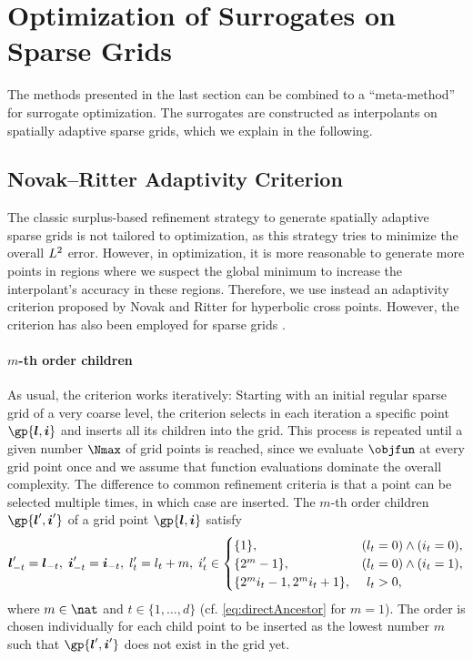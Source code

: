 \section{Optimization of Surrogates on Sparse Grids}
\label{sec:52method}

The methods presented in the last section can be combined to a
``meta-method'' for surrogate optimization.
The surrogates are constructed as interpolants on spatially adaptive
sparse grids, which we explain in the following.



\subsection{Novak--Ritter Adaptivity Criterion}
\label{sec:521novakRitter}

The classic surplus-based refinement strategy to generate
spatially adaptive sparse grids is not tailored to optimization,
as this strategy tries to minimize the overall $L^2$ error.
However, in optimization, it is more reasonable to generate more
points in regions where we suspect the global minimum
to increase the interpolant's accuracy in these regions.
Therefore, we use instead an adaptivity criterion proposed by
Novak and Ritter \cite{Novak96Global} for hyperbolic cross points.
However, the criterion has also been employed for sparse grids
.

\paragraph{$m$-th order children}

As usual, the criterion works iteratively:
Starting with an initial regular sparse grid of a very coarse level,
the criterion selects in each iteration a specific point $\gp{\*l,\*i}$
and inserts all its children into the grid.
This process is repeated until a given number $\Nmax$ of grid points is
reached,
since we evaluate $\objfun$ at every grid point once and we assume that
function evaluations dominate the overall complexity.
The difference to common refinement criteria is that
a point can be selected multiple times, in which case
 are inserted.
The $m$-th order children $\gp{\*l',\*i'}$ of a grid point $\gp{\*l,\*i}$
satisfy
\begin{equation}
  \label{eq:indirectChild}
  {\boldsymbol{l}}'_{-t} = {\boldsymbol{l}}_{-t},\;
  {\boldsymbol{i}}'_{-t} = {\boldsymbol{i}}_{-t},\;
  l'_t = l_t + m,\;
  i'_t \in
  \begin{cases}
    \{1\},&(l_t = 0) \land (i_t = 0),\\
    \{2^m - 1\},&(l_t = 0) \land (i_t = 1),\\
    \{2^m i_t - 1, 2^m i_t + 1\},&\hphantom{(}l_t > 0,
  \end{cases}
\end{equation}
where $m \in \nat$ and $t \in \{1, \dotsc, d\}$
(cf. \eqref{eq:directAncestor} for $m = 1$).
The order is chosen individually for each child point to be inserted
as the lowest number $m$ such that $\gp{\*l',\*i'}$ does not exist
in the grid yet.

